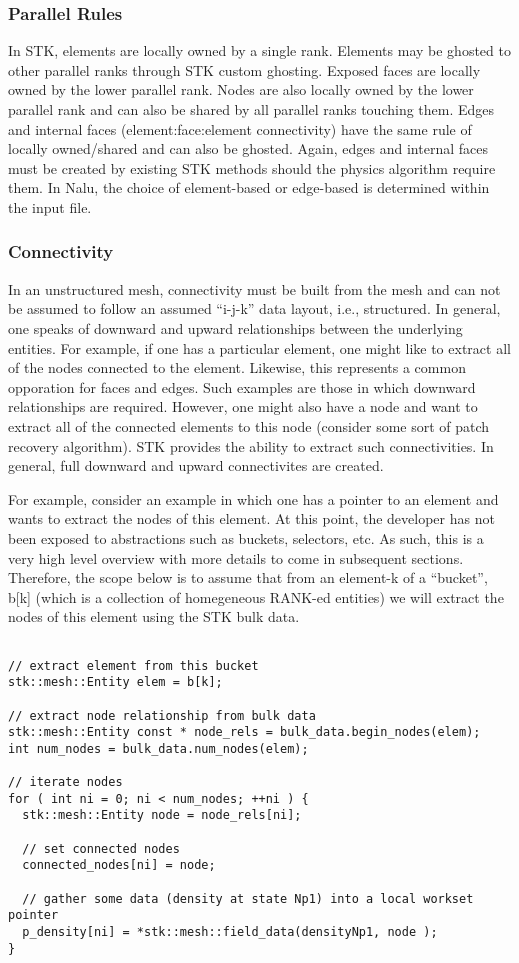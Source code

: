 \subsubsection{Parallel Rules}
In STK, elements are locally owned by a single rank. Elements may be ghosted to other parallel ranks
through STK custom ghosting. Exposed faces are locally owned by the lower parallel rank. Nodes
are also locally owned by the lower parallel rank and can also be shared by all parallel ranks touching
them. Edges and internal faces (element:face:element connectivity) have the same rule of locally 
owned/shared and can also be ghosted. Again, edges and internal faces must be created by existing
STK methods should the physics algorithm require them. In Nalu, the choice of element-based 
or edge-based is determined within the input file.

\subsubsection{Connectivity}
In an unstructured mesh, connectivity must be built from the mesh and can not be assumed to 
follow an assumed ``i-j-k'' data layout, i.e., structured. In general, one speaks of downward and upward 
relationships between the underlying entities. For example, if one has a particular element, one might
like to extract all of the nodes connected to the element. Likewise, this represents a common opporation
for faces and edges. Such examples are those in which downward relationships are required. 
However, one might also have a node and want to extract all of the connected elements to this 
node (consider some sort of patch recovery algorithm). STK provides the ability to extract 
such connectivities. In general, full downward and upward connectivites are created.

For example, consider an example in which one has a pointer to an element and wants to 
extract the nodes of this element. At this point, the developer has not been exposed to 
abstractions such as buckets, selectors, etc. As such, this is a very high level overview
with more details to come in subsequent sections. Therefore, the scope below is to assume that
from an element-k of a ``bucket'', b[k] (which is a collection of homegeneous RANK-ed entities) 
we will extract the nodes of this element using the STK bulk data.

\begin{lstlisting}

// extract element from this bucket
stk::mesh::Entity elem = b[k];

// extract node relationship from bulk data
stk::mesh::Entity const * node_rels = bulk_data.begin_nodes(elem);
int num_nodes = bulk_data.num_nodes(elem);

// iterate nodes
for ( int ni = 0; ni < num_nodes; ++ni ) {
  stk::mesh::Entity node = node_rels[ni];
  
  // set connected nodes
  connected_nodes[ni] = node;
  
  // gather some data (density at state Np1) into a local workset pointer
  p_density[ni] = *stk::mesh::field_data(densityNp1, node );
}

\end{lstlisting}

